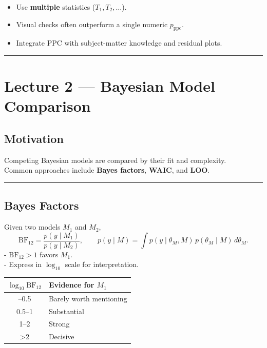 \documentclass[
  letterpaper,
  DIV=11,
  numbers=noendperiod]{scrreprt}
\providecommand{\tightlist}{%
  \setlength{\itemsep}{0pt}\setlength{\parskip}{0pt}}
\begin{document}
\begin{itemize}
\tightlist
\item
  Use \textbf{multiple} statistics (\(T_1, T_2,\dots\)).\\
\item
  Visual checks often outperform a single numeric \(p_{\text{ppc}}\).\\
\item
  Integrate PPC with subject-matter knowledge and residual plots.
\end{itemize}

\begin{center}\rule{0.5\linewidth}{0.5pt}\end{center}

\section{Lecture 2 --- Bayesian Model
Comparison}\label{lecture-2-bayesian-model-comparison}

\subsection{Motivation}\label{motivation-1}

Competing Bayesian models are compared by their fit and complexity.\\
Common approaches include \textbf{Bayes factors}, \textbf{WAIC}, and
\textbf{LOO}.

\begin{center}\rule{0.5\linewidth}{0.5pt}\end{center}

\subsection{Bayes Factors}\label{bayes-factors}

Given two models \(M_1\) and \(M_2\), \[
\text{BF}_{12} = \frac{p(y\mid M_1)}{p(y\mid M_2)} ,\qquad
p(y\mid M)=\int p(y\mid\theta_M,M)\,p(\theta_M\mid M)\,d\theta_M.
\] - \(\text{BF}_{12}>1\) favors \(M_1\).\\
- Express in \(\log_{10}\) scale for interpretation.

\begin{longtable}[]{@{}cl@{}}
\toprule\noalign{}
\(\log_{10}\text{BF}_{12}\) & Evidence for \(M_1\) \\
\midrule\noalign{}
\endhead
\bottomrule\noalign{}
\endlastfoot
0--0.5 & Barely worth mentioning \\
0.5--1 & Substantial \\
1--2 & Strong \\
\textgreater2 & Decisive \\
\end{longtable}
\end{document}
